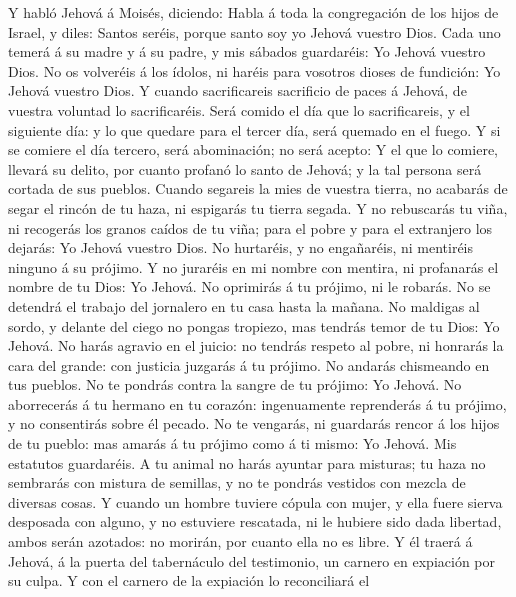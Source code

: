  Y habló Jehová á Moisés, diciendo:  Habla á
toda la congregación de los hijos de Israel, y diles: Santos seréis,
porque santo soy yo Jehová vuestro Dios.  Cada uno temerá á
su madre y á su padre, y mis sábados guardaréis: Yo Jehová vuestro Dios.
 No os volveréis á los ídolos, ni haréis para vosotros
dioses de fundición: Yo Jehová vuestro Dios.  Y cuando
sacrificareis sacrificio de paces á Jehová, de vuestra voluntad lo
sacrificaréis.  Será comido el día que lo sacrificareis, y
el siguiente día: y lo que quedare para el tercer día, será quemado en
el fuego.  Y si se comiere el día tercero, será abominación;
no será acepto:  Y el que lo comiere, llevará su delito, por
cuanto profanó lo santo de Jehová; y la tal persona será cortada de sus
pueblos.  Cuando segareis la mies de vuestra tierra, no
acabarás de segar el rincón de tu haza, ni espigarás tu tierra segada.
 Y no rebuscarás tu viña, ni recogerás los granos caídos de
tu viña; para el pobre y para el extranjero los dejarás: Yo Jehová
vuestro Dios.  No hurtaréis, y no engañaréis, ni mentiréis
ninguno á su prójimo.  Y no juraréis en mi nombre con
mentira, ni profanarás el nombre de tu Dios: Yo Jehová.  No
oprimirás á tu prójimo, ni le robarás. No se detendrá el trabajo del
jornalero en tu casa hasta la mañana.  No maldigas al
sordo, y delante del ciego no pongas tropiezo, mas tendrás temor de tu
Dios: Yo Jehová.  No harás agravio en el juicio: no tendrás
respeto al pobre, ni honrarás la cara del grande: con justicia juzgarás
á tu prójimo.  No andarás chismeando en tus pueblos. No te
pondrás contra la sangre de tu prójimo: Yo Jehová.  No
aborrecerás á tu hermano en tu corazón: ingenuamente reprenderás á tu
prójimo, y no consentirás sobre él pecado.  No te vengarás,
ni guardarás rencor á los hijos de tu pueblo: mas amarás á tu prójimo
como á ti mismo: Yo Jehová.  Mis estatutos guardaréis. A tu
animal no harás ayuntar para misturas; tu haza no sembrarás con mistura
de semillas, y no te pondrás vestidos con mezcla de diversas cosas.
 Y cuando un hombre tuviere cópula con mujer, y ella fuere
sierva desposada con alguno, y no estuviere rescatada, ni le hubiere
sido dada libertad, ambos serán azotados: no morirán, por cuanto ella no
es libre.  Y él traerá á Jehová, á la puerta del
tabernáculo del testimonio, un carnero en expiación por su culpa.
 Y con el carnero de la expiación lo reconciliará el
